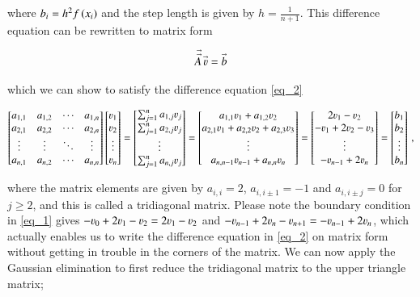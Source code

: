 \documentclass[11pt,english,a4paper]{article}
\begin{document}
\begin{flushleft}
where $b_i = h^2 f\left({x_i}\right)$ and the step length is given by $h = \frac{1}{n+1}$. This difference equation can be rewritten to matrix form

\begin{align*}
\vec{\vec{A}}\,\vec{\varv} = \vec{b} 
\end{align*}

which we can show to satisfy the difference equation \eqref{eq_2}

\begin{align*}
\begin{bmatrix} a_{1,1} & a_{1,2} & \cdots & a_{1,n} \\ a_{2,1} & a_{2,2} & \cdots & a_{2,n}  \\ \vdots & \vdots & \ddots & \vdots \\ a_{n,1} & a_{n,2} & \cdots & a_{n,n} \end{bmatrix} \begin{bmatrix} \varv_1 \\ \varv_2 \\ \vdots \\  \varv_n \end{bmatrix} 
= \begin{bmatrix} \sum_{j=1}^n a_{1,j} \varv_j \\ \sum_{j=1}^n a_{2,j} \varv_j \\ \vdots \\ \sum_{j=1}^n a_{n,j} \varv_j \end{bmatrix} 
= \begin{bmatrix} a_{1,1} \varv_1 + a_{1,2} \varv_2 \\ a_{2,1} \varv_1 + a_{2,2} \varv_2 + a_{2,3} \varv_3 \\ \vdots \\ a_{n,n-1} \varv_{n-1} + a_{n,n} \varv_n \end{bmatrix} = \begin{bmatrix} 2 \varv_1 - \varv_2 \\ -\varv_1 + 2 \varv_2 - \varv_3 \\ \vdots \\ -\varv_{n-1} + 2 \varv_n \end{bmatrix} = \begin{bmatrix} b_1 \\ b_2 \\ \vdots \\ b_n \end{bmatrix} \,,  
\end{align*}

where the matrix elements are given by $a_{i,i} = 2$, $a_{i,i\pm 1} = -1$ and $a_{i,i\pm j} = 0$ for $j \geq 2$, and this is called a tridiagonal matrix. Please note the boundary condition in \eqref{eq_1} gives $-\varv_0 + 2 \varv_1 - \varv_2 = 2 \varv_1 - \varv_2$ and $-\varv_{n-1}+ 2\varv_n - \varv_{n+1} = -\varv_{n-1} + 2 \varv_n$, which actually enables us to write the difference equation in \eqref{eq_2} on matrix form without getting in trouble in the corners of the matrix. We can now apply the Gaussian elimination to first reduce the tridiagonal matrix to the upper triangle matrix;


\end{flushleft}
\end{document}
